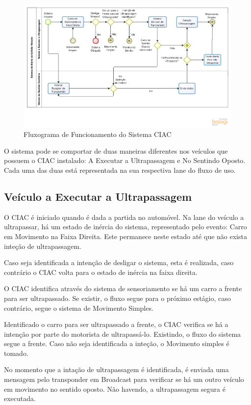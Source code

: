 \begin{figure}[h]
  \centering
  \includegraphics[width=470px, scale=1]{figuras/funcionamento_sistema}
  \caption{Fluxograma de Funcionamento do Sistema CIAC}
\label{fig:funcionamento_sistema}
\end{figure}

O sistema pode se comportar de duas maneiras diferentes nos veículos que possuem
o CIAC instalado: A Executar a Ultrapassagem e No Sentindo Oposto. Cada uma das duas
está representada na sua respectiva lane do fluxo de uso.

\subsection{Veículo a Executar a Ultrapassagem}
O CIAC é iniciado quando é dada a partida no automóvel. Na lane do veículo a ultrapassar,
há um estado de inércia do sistema, representado pelo evento: Carro em Movimento
na Faixa Direita. Este permanece neste estado até que não exista inteção de
ultrapassagem.

Caso seja identificada a intenção de desligar o sistema, esta é realizada, caso
contrário o CIAC volta para o estado de inércia na faixa direita.

O CIAC identifica através do sistema de sensoriamento se há um carro a frente
para ser ultrapassado. Se existir, o fluxo segue para o próximo estágio, caso
contrário, segue o sistema de Movimento Simples.

Identificado o carro para ser ultrapassado a frente, o CIAC verifica se há a
intenção por parte do motorista de ultrapassá-lo. Existindo, o fluxo do sistema
segue a frente. Caso não seja identificada a inteção, o Movimento simples
é tomado.

No momento que a intação de ultrapassagem é identificada, é enviada uma mensagem
pelo transponder em Broadcast para verificar se há um outro veículo em movimento
no sentido oposto. Não havendo, a ultrapassagem segura é executada.

